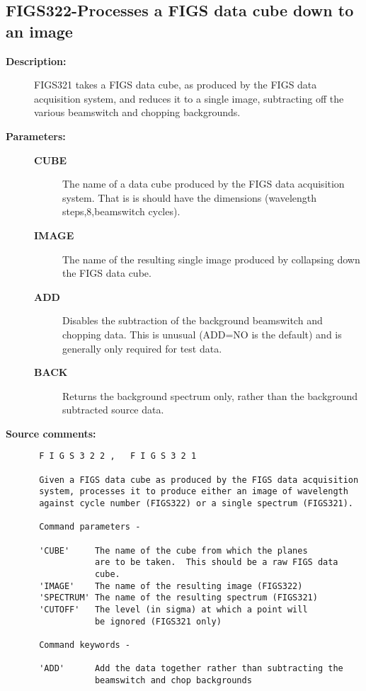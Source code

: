 \subsection{FIGS322-\label{FIGS322}Processes a FIGS data cube down to an image}
\begin{description}

\item [{\bf Description:}]
 FIGS321 takes a FIGS data cube, as produced by the FIGS data
 acquisition system, and reduces it to a single image, subtracting
 off the various beamswitch and chopping backgrounds.

\item [{\bf Parameters:}]
\begin{description}
\item [{\bf CUBE}]
 The name of a data cube produced by the FIGS data
 acquisition system.  That is is should have the
 dimensions (wavelength steps,8,beamswitch cycles).
\item [{\bf IMAGE}]
 The name of the resulting single image produced
 by collapsing down the FIGS data cube.
\item [{\bf ADD}]
 Disables the subtraction of the background beamswitch
 and chopping data.  This is unusual (ADD=NO is the
 default) and is generally only required for test data.
\item [{\bf BACK}]
 Returns the background spectrum only, rather than the
 background subtracted source data.
\end{description}

\item [{\bf Source comments:}]
\begin{verbatim}
 F I G S 3 2 2 ,   F I G S 3 2 1

 Given a FIGS data cube as produced by the FIGS data acquisition
 system, processes it to produce either an image of wavelength
 against cycle number (FIGS322) or a single spectrum (FIGS321).

 Command parameters -

 'CUBE'     The name of the cube from which the planes
            are to be taken.  This should be a raw FIGS data
            cube.
 'IMAGE'    The name of the resulting image (FIGS322)
 'SPECTRUM' The name of the resulting spectrum (FIGS321)
 'CUTOFF'   The level (in sigma) at which a point will
            be ignored (FIGS321 only)

 Command keywords -

 'ADD'      Add the data together rather than subtracting the
            beamswitch and chop backgrounds


\end{verbatim}
\end{description}
